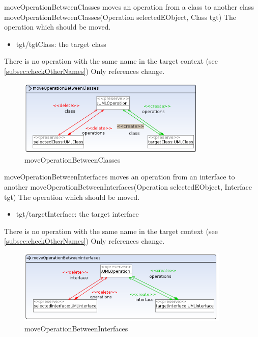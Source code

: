 \op
{moveOperationBetweenClasses}
{moves an operation from a class to another class}
{moveOperationBetweenClasses(Operation selectedEObject, Class tgt)}
{The operation which should be moved.}
{
\begin{itemize}
 \item tgt/tgtClass: the target class
\end{itemize}
}
{There is no operation with the same name in the target context (see
\ref{subsec:checkOtherNames})}
{Only references change.}
\begin{figure}[H]
  \centering
  \includegraphics[width=0.8\textwidth]{pics/moveOperationBetweenClasses.png}
  \caption{moveOperationBetweenClasses}
  \label{moveOperationBetweenClasses}
\end{figure}
\op
{moveOperationBetweenInterfaces}
{moves an operation from an interface to another}
{moveOperationBetweenInterfaces(Operation selectedEObject, Interface tgt)}
{The operation which should be moved.}
{
\begin{itemize}
 \item tgt/targetInterface: the target interface
\end{itemize}
}
{There is no operation with the same name in the target context (see
\ref{subsec:checkOtherNames})}
{Only references change.}
\begin{figure}[H]
  \centering
  \includegraphics[width=0.9\textwidth]{pics/moveOperationBetweenInterfaces.png}
  \caption{moveOperationBetweenInterfaces}
  \label{moveOperationBetweenInterfaces}
\end{figure}
